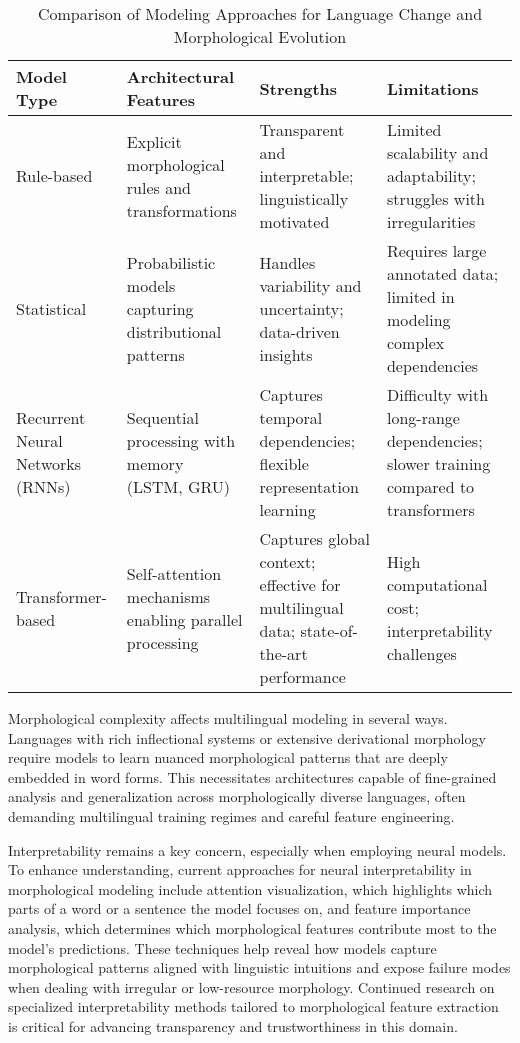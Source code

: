 \documentclass[sigconf]{acmart}
\begin{document}
\begin{table*}[htbp]
\centering
\caption{Comparison of Modeling Approaches for Language Change and Morphological Evolution}
\label{tab:model-comparison}
\begin{adjustbox}{max width=\textwidth}
\begin{tabular}{@{}llll@{}}
\toprule
Model Type & Architectural Features & Strengths & Limitations \\ \midrule
Rule-based & Explicit morphological rules and transformations & Transparent and interpretable; linguistically motivated & Limited scalability and adaptability; struggles with irregularities \\
Statistical & Probabilistic models capturing distributional patterns & Handles variability and uncertainty; data-driven insights & Requires large annotated data; limited in modeling complex dependencies \\
Recurrent Neural Networks (RNNs) & Sequential processing with memory (LSTM, GRU) & Captures temporal dependencies; flexible representation learning & Difficulty with long-range dependencies; slower training compared to transformers \\
Transformer-based & Self-attention mechanisms enabling parallel processing & Captures global context; effective for multilingual data; state-of-the-art performance & High computational cost; interpretability challenges \\ \bottomrule
\end{tabular}
\end{adjustbox}
\end{table*}

Morphological complexity affects multilingual modeling in several ways. Languages with rich inflectional systems or extensive derivational morphology require models to learn nuanced morphological patterns that are deeply embedded in word forms. This necessitates architectures capable of fine-grained analysis and generalization across morphologically diverse languages, often demanding multilingual training regimes and careful feature engineering.

Interpretability remains a key concern, especially when employing neural models. To enhance understanding, current approaches for neural interpretability in morphological modeling include attention visualization, which highlights which parts of a word or a sentence the model focuses on, and feature importance analysis, which determines which morphological features contribute most to the model's predictions. These techniques help reveal how models capture morphological patterns aligned with linguistic intuitions and expose failure modes when dealing with irregular or low-resource morphology. Continued research on specialized interpretability methods tailored to morphological feature extraction is critical for advancing transparency and trustworthiness in this domain.
\end{document}
